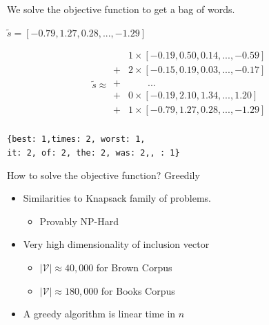 \documentclass[]{beamer}
\newcommand{\iitem}[1]{\begin{itemize}
		\item #1
	\end{itemize}}
\newcommand{\s}{\tilde{s}}
\newcommand{\x}{\tilde{x}}
\newcommand{\V}{\mathcal{V}}
\newcommand{\B}{\mathcal{B}}
\begin{document}
\begin{frame}[fragile]{We solve the objective function to get a bag of words.}
	\vectorselectionproblemdefn
	\vfill
	\begin{description}
		\item<2->[Input Vector]  $\s=[−0.79, 1.27, 0.28, ..., −1.29]$
		\vfill
		\item<3->[Vector Selection] 
		\begin{equation*}
		\s \approx \begin{array}{ll}
		&1\times[−0.19, 0.50, 0.14, ..., −0.59]\\
		+&2\times[-0.15, 0.19, 0.03, ..., -0.17]\\
		+&\qquad...\\
		+&0\times[−0.19, 2.10, 1.34, ..., 1.20]\\
		+&1\times[−0.79, 1.27, 0.28, ..., −1.29]\\
		\end{array}
		\end{equation*}
		\vfill
		\item<4->[BOW] \texttt{\{best: 1,times: 2, worst: 1, \\it: 2, of: 2, the: 2, was: 2,, : 1\}}
	\end{description}
	\vfill

\end{frame}

\begin{frame}{How to solve the objective function? Greedily}
	\vectorselectionproblemdefn
		\vfill
	\begin{itemize}
		\item<1-> Similarities to Knapsack family of problems.
		\iitem{Provably NP-Hard} 
		\item<2-> Very high dimensionality of inclusion vector
		\begin{itemize}
			\item $|\V|\approx40,000$ for Brown Corpus
			\item $|\V|\approx180,000$ for Books Corpus
			\end{itemize}
		\item<3-> A greedy algorithm is linear time in $n$ 
	\end{itemize}
	\vfill
\end{frame}

\newcommand{\vectorselectionproblemdefnalt}{Find the bag of vectors $\B$ (a multi-subset of $\V$), such that we have  $\min d(\s,\sum_{\x_a\in\B}\x_a)$}
\end{document}
